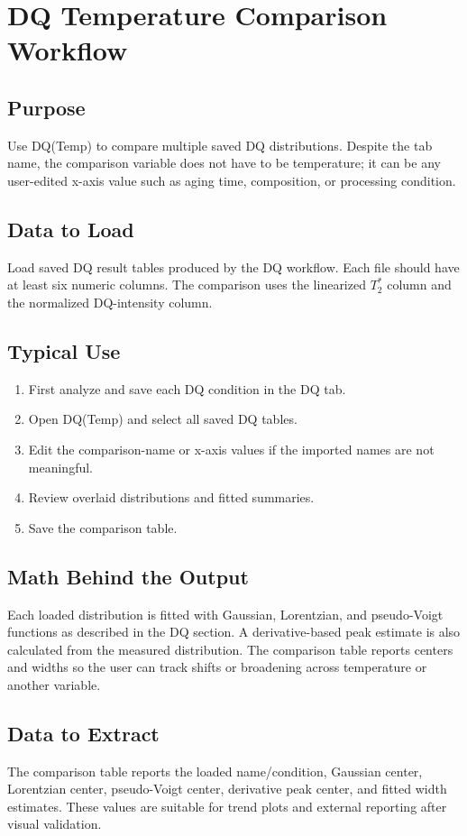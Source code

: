 \documentclass[11pt,a4paper]{article}
\newcommand{\TtwoStar}{\ensuremath{T_2^{\ast}}}
\begin{document}
\section{DQ Temperature Comparison Workflow}

\subsection{Purpose}
Use DQ(Temp) to compare multiple saved DQ distributions. Despite the tab name, the comparison variable does not have to be temperature; it can be any user-edited x-axis value such as aging time, composition, or processing condition.

\subsection{Data to Load}
Load saved DQ result tables produced by the DQ workflow. Each file should have at least six numeric columns. The comparison uses the linearized \TtwoStar{} column and the normalized DQ-intensity column.

\subsection{Typical Use}
\begin{enumerate}
  \item First analyze and save each DQ condition in the DQ tab.
  \item Open DQ(Temp) and select all saved DQ tables.
  \item Edit the comparison-name or x-axis values if the imported names are not meaningful.
  \item Review overlaid distributions and fitted summaries.
  \item Save the comparison table.
\end{enumerate}

\subsection{Math Behind the Output}
Each loaded distribution is fitted with Gaussian, Lorentzian, and pseudo-Voigt functions as described in the DQ section. A derivative-based peak estimate is also calculated from the measured distribution. The comparison table reports centers and widths so the user can track shifts or broadening across temperature or another variable.

\subsection{Data to Extract}
The comparison table reports the loaded name/condition, Gaussian center, Lorentzian center, pseudo-Voigt center, derivative peak center, and fitted width estimates. These values are suitable for trend plots and external reporting after visual validation.
\end{document}
